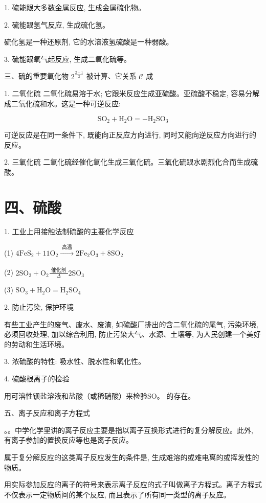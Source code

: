 \documentclass[10pt]{article}
\begin{document}
1. 硫能跟大多数金属反应, 生成金属硫化物。

2. 硫能跟氢气反应, 生成硫化氢。

硫化氢是一种还原剂, 它的水溶液氢硫酸是一种弱酸。

3. 硫能跟氧气起反应, 生成二氧化硫等。

三、硫的重要氧化物 \({2}^{\frac{2 - 1}{2}}\) 被计算、它关系 \(\mathcal{C}\) 成

1. 二氧化硫 二氧化硫易溶于水; 它跟米反应生成亚硫酸。亚硫酸不稳定, 容易分解成二氧化硫和水。这是一种可逆反应:

\[
{\mathrm{{SO}}}_{2} + {\mathrm{H}}_{2}\mathrm{O} = - {\mathrm{H}}_{2}{\mathrm{{SO}}}_{3}
\]

可逆反应是在同一条件下, 既能向正反应方向进行, 同时又能向逆反应方向进行的反应。

2. 三氧化硫 二氧化硫经催化氧化生成三氧化硫。三氧化硫跟水剧烈化合而生成硫酸。

\section*{四、硫酸}

1. 工业上用接触法制硫酸的主要化学反应

(1) \(4{\mathrm{{FeS}}}_{2} + {11}{\mathrm{O}}_{2}\xrightarrow[]{\text{ 高温 }}2{\mathrm{{Fe}}}_{2}{\mathrm{O}}_{3} + 8{\mathrm{{SO}}}_{2}\)

(2) \(2{\mathrm{{SO}}}_{2} + {\mathrm{O}}_{2}\frac{\text{ 催化剂 }}{\Delta }2{\mathrm{{SO}}}_{3}\)

(3) \({\mathrm{{SO}}}_{3} + {\mathrm{H}}_{2}\mathrm{O} = {\mathrm{H}}_{2}{\mathrm{{SO}}}_{4}\)

2. 防止污染, 保护环境

有些工业产生的废气、废水、废渣, 如硫酸厂排出的含二氧化硫的尾气, 污染环境, 必须回收处理, 加以综合利用, 防止污染大气、水源、土壤等, 为人民创建一个美好的劳动和生活环境。

3. 浓硫酸的特性: 吸水性、脱水性和氧化性。

4. 硫酸根离子的检验

用可溶性钡盐溶液和盐酸（或稀硝酸）来检验SO。 的存在。

五、离子反应和离子方程式

。。中学化学里讲的离子反应主要是指以离子互换形式进行的复分解反应。此外, 有离子参加的置换反应等也是离子反应。

属于复分解反应的这类离子反应发生的条件是, 生成难溶的或难电离的或挥发性的物质。

用实际参加反应的离子的符号来表示离子反应的式子叫做离子方程式。离子方程式不仅表示一定物质间的某个反应, 而且表示了所有同一类型的离子反应。
\end{document}

